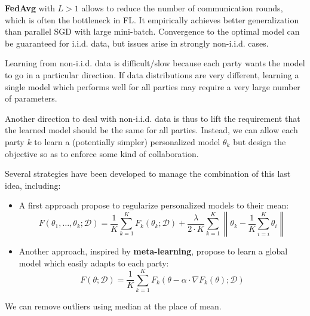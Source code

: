 \textbf{FedAvg} with $L > 1$ allows to reduce the number of communication rounds,
which is often the bottleneck in FL. It empirically achieves better generalization
than parallel SGD with large mini-batch. Convergence to the optimal model can be
guaranteed for i.i.d. data, but issues arise in strongly non-i.i.d. cases.

Learning from non-i.i.d. data is difficult/slow because each party wants the model
to go in a particular direction. If data distributions are very different, learning
a single model which performs well for all parties may require a very large number
of parameters.

Another direction to deal with non-i.i.d. data is thus to lift the requirement
that the learned model should be the same for all parties. Instead, we can allow
each party $k$ to learn a (potentially simpler) personalized model $\theta_k$
but design the objective so as to enforce some kind of collaboration.

Several strategies have been developed to manage the combination of this last
idea, including:
\begin{itemize}
    \item A first approach propose to regularize personalized models to their mean:
          \begin{equation}
              F(\theta_1, \dots, \theta_k; \mathcal{D}) = \frac{1}{K} \sum_{k = 1}^K F_k(\theta_k; \mathcal{D}) + \frac{\lambda}{2 \cdot K} \sum_{k = 1}^K \left\|\theta_k - \frac{1}{K} \sum_{i = i}^K \theta_i\right\|
          \end{equation}
    \item Another approach, inspired by \textbf{meta-learning}, propose to learn
          a global model which easily adapts to each party:
          \begin{equation}
              F(\theta; \mathcal{D}) = \frac{1}{K} \sum_{k = 1}^K F_k(\theta - \alpha \cdot \nabla F_k(\theta); \mathcal{D})
          \end{equation}
\end{itemize}

We can remove outliers using median at the place of mean.